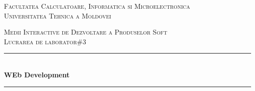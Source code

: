 \begin{center} %
	
	
	
	
	
	
	\textsc{\large Facultatea Calculatoare, Informatica si Microelectronica}\\[0.5cm]
	
	\textsc{\large Universitatea Tehnica a Moldovei}\\[1.2cm] %
	
	\vspace{25 mm}
	
	
	
	\textsc{\Large Medii Interactive de Dezvoltare a Produselor Soft}\\[0.5cm] %
	
	\textsc{\large Lucrarea de laborator\#3}\\[0.5cm] %
	
	
	
	
	\newcommand{\HRule}{\rule{\linewidth}{0.5mm}} %
	
	
	
	
	
	
	\vspace{10 mm}
	
	\HRule \\[0.4cm]
	
	{ \LARGE \bfseries WEb Development  }\\[0.4cm] %
	
	\HRule \\[1.5cm]
	
	
	
	

\end{center}
